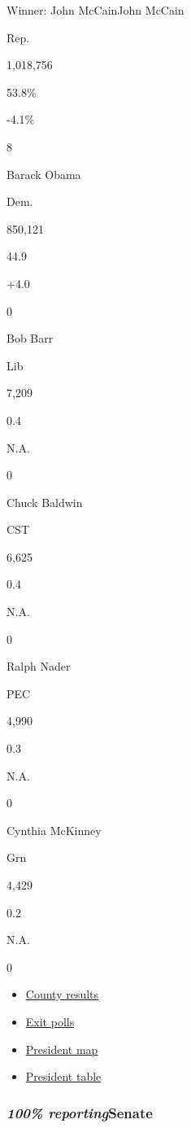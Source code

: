 Winner: John McCainJohn McCain

Rep.

1,018,756

53.8\%

-4.1\%

8

Barack Obama

Dem.

850,121

44.9~~~

+4.0~~~

0

Bob Barr

Lib

7,209

0.4~~~

N.A.~~~

0

Chuck Baldwin

CST

6,625

0.4~~~

N.A.~~~

0

Ralph Nader

PEC

4,990

0.3~~~

N.A.~~~

0

Cynthia McKinney

Grn

4,429

0.2~~~

N.A.~~~

0

\begin{itemize}
\tightlist
\item
  \href{president/south-carolina.html}{County results}
\item
  \href{exitpolls/south-carolina.html}{Exit polls}
\item
  \href{../president/votes.html}{President map}
\item
  \href{../president/votes.html}{President table}
\end{itemize}

\hypertarget{100-reportingsenate}{%
\subsubsection{\texorpdfstring{\emph{100\%
reporting}Senate}{100\% reportingSenate}}\label{100-reportingsenate}}

